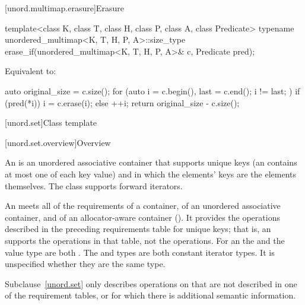 [unord.multimap.erasure]{Erasure}

%
\begin{itemdecl}
template<class K, class T, class H, class P, class A, class Predicate>
  typename unordered_multimap<K, T, H, P, A>::size_type
    erase_if(unordered_multimap<K, T, H, P, A>& c, Predicate pred);
\end{itemdecl}

\begin{itemdescr}
\pnum
\effects
Equivalent to:
\begin{codeblock}
auto original_size = c.size();
for (auto i = c.begin(), last = c.end(); i != last; ) {
  if (pred(*i)) {
    i = c.erase(i);
  } else {
    ++i;
  }
}
return original_size - c.size();
\end{codeblock}
\end{itemdescr}

[unord.set]{Class template }%

[unord.set.overview]{Overview}

\pnum
{}%
%
An  is an unordered associative container that
supports unique keys (an  contains at most one of each
key value) and in which the elements' keys are the elements
themselves.
The  class
supports forward iterators.

\pnum
An  meets all of the requirements of a container, of an unordered associative container, and of an allocator-aware container (). It provides the operations described in the preceding requirements table for unique keys; that is, an  supports the  operations in that table, not the  operations. For an  the  and the value type are both . The  and  types are both constant iterator types. It is unspecified whether they are the same type.

\pnum
Subclause~\ref{unord.set} only describes operations on  that
are not described in one of the requirement tables, or for which there
is additional semantic information.

